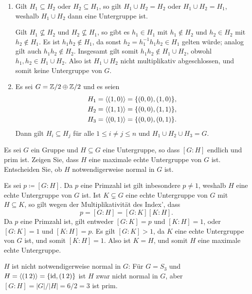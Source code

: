 \begin{solution}
  \begin{enumerate}
    \item
      Gilt $H_1 \subseteq H_2$ oder $H_2 \subseteq H_1$, so gilt $H_1 \cup H_2 = H_2$ oder $H_1 \cup H_2 = H_1$, weshalb $H_1 \cup H_2$ dann eine Untergruppe ist.
      
      Gilt $H_1 \nsubseteq H_2$ und $H_2 \nsubseteq H_1$, so gibt es $h_1 \in H_1$ mit $h_1 \notin H_2$ und $h_2 \in H_2$ mit $h_2 \notin H_1$.
      Es ist $h_1 h_2 \notin H_1$, da sonst $h_2 = h_1^{-1} h_1 h_2 \in H_1$ gelten würde;
      analog gilt auch $h_1 h_2 \notin H_2$.
      Insgesamt gilt somit $h_1 h_2 \notin H_1 \cup H_2$, obwohl $h_1, h_2 \in H_1 \cup H_2$.
      Also ist $H_1 \cup H_2$ nicht multiplikativ abgeschlossen, und somit keine Untergruppe von $G$.
    \item
      Es sei $G = \mathbb{Z}/2 \oplus \mathbb{Z}/2$ und es seien
      \begin{align*}
        H_1 &= \left\langle  (1,0)  \right\rangle = \{ (0,0), (1,0) \},
        \\
        H_2 &= \left\langle  (1,1)  \right\rangle = \{ (0,0), (1,1) \},
        \\
        H_3 &= \left\langle  (0,1)  \right\rangle = \{ (0,0), (0,1) \}.
      \end{align*}
      Dann gilt $H_i \subseteq H_j$ für alle $1 \leq i \neq j \leq n$ und $H_1 \cup H_2 \cup H_3 = G$.
  \end{enumerate}
\end{solution}


\begin{question}[subtitle = Ein Kriterium für maximale Untergruppen]
  Es sei $G$ ein Gruppe und $H \subseteq G$ eine Untergruppe, so dass $[G : H]$ endlich und prim ist.
  Zeigen Sie, dass $H$ eine maximale echte Untergruppe von $G$ ist. Entscheiden Sie, ob $H$ notwendigerweise normal in $G$ ist.
\end{question}


\begin{solution}
  Es sei $p \coloneqq [G : H]$.
  Da $p$ eine Primzahl ist gilt inbesondere $p \neq 1$, weshalb $H$ eine echte Untergruppe von $G$ ist.
  Ist $K \subsetneq G$ eine echte Untergruppe von $G$ mit $H \subseteq K$, so gilt wegen der Multiplikativität des Index’, dass 
  \[
      p
    = [G : H]
    = [G : K] [K : H].
  \]
  Da $p$ eine Primzahl ist, gilt entweder $[G : K] = p$ und $[K : H] = 1$, oder $[G : K] = 1$ und $[K : H] = p$.
  Es gilt $[G : K] > 1$, da $K$ eine echte Untergruppe von $G$ ist, und somit $[K : H] = 1$.
  Also ist $K = H$, und somit $H$ eine maximale echte Untergruppe.
  
  $H$ ist nicht notwendigerweise normal in $G$:
  Für $G = S_3$ und $H = \left\langle (1\,2) \right\rangle = \{\operatorname{id}, (1\,2)\}$ ist $H$ zwar nicht normal in $G$, aber $[G : H] = |G|/|H| = 6/2 = 3$ ist prim.
\end{solution}


